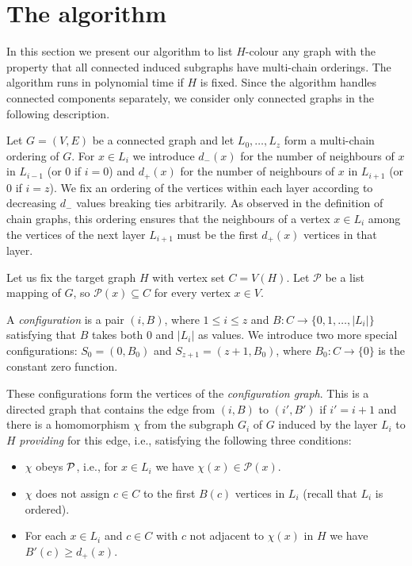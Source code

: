 \documentclass[12pt]{llncs}
\begin{document}
\section{The algorithm}
In this section we present our algorithm to list $H$-colour any graph with
the property that all connected induced subgraphs have multi-chain
orderings. The algorithm runs in polynomial time if $H$ is fixed.
Since the algorithm handles connected components separately,
we consider only connected graphs in the following description.

Let $G=(V,E)$ be a connected graph and let $L_0,\ldots,L_z$ form a multi-chain
ordering of $G$. For $x\in L_i$ we introduce $d_-(x)$ for the number
of neighbours of $x$ in $L_{i-1}$ (or $0$ if $i=0$) and $d_+(x)$ for
the number of neighbours of $x$ in $L_{i+1}$ (or $0$ if $i=z$). We fix an
ordering of the vertices within each layer according to decreasing $d_-$
values breaking ties arbitrarily. 
As observed in the definition of chain graphs, this ordering ensures that the
neighbours of a vertex $x\in L_i$ among the vertices of the next layer
$L_{i+1}$ must be the first $d_+(x)$ vertices in that layer.

Let us fix the target graph $H$ with vertex set $C=V(H)$.
Let $\mathcal P$ be a list mapping of $G$, so $\mathcal P(x)\subseteq C$ for
every vertex $x\in V$.

A \emph{configuration} is a pair $(i,B)$, where $1\le i\le z$ and
$B:C\to\{0,1,\ldots,|L_i|\}$ satisfying that $B$ takes both $0$ and
$|L_i|$ as values. We introduce two more special configurations:
$S_0=(0,B_0)$ and $S_{z+1}=(z+1,B_0)$, where $B_0:C\to\{0\}$ is the constant
zero function.

These configurations form the vertices of the {\em configuration
graph}. This is a directed graph that contains the edge from
$(i,B)$ to $(i',B')$ if $i'=i+1$ and there
is a homomorphism $\chi$ from the subgraph $G_i$ of $G$ induced by the
layer $L_i$ to $H$ {\em providing} for this edge, i.e.,
satisfying the following three conditions:

\begin{itemize}
\item {$\chi$ obeys $\cal P$, i.e., for $x\in L_i$ we have
  $\chi(x)\in\mathcal P(x)$.}
  
\item{$\chi$ does not assign $c\in C$ to the first $B(c)$
  vertices in $L_i$ (recall that $L_i$ is ordered).}
  
\item {For each $x\in L_i$ and $c\in C$ with $c$ not adjacent
  to $\chi(x)$ in $H$ we have $B'(c)\ge d_+(x)$.}
\end{itemize}
\end{document}
